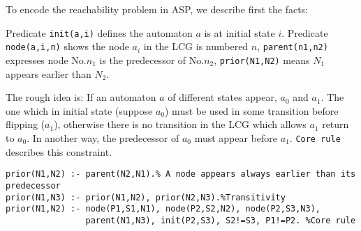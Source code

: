 \documentclass[en]{jdoc}
\begin{document}
To encode the reachability problem in ASP, we describe first the facts:

Predicate \texttt{init(a,i)} defines the automaton $a$ is at initial state $i$. %
Predicate \texttt{node(a,i,n)} shows the node $a_i$ in the LCG is numbered $n$, \texttt{parent(n1,n2)} expresses node No.$n_1$ is the predecessor of No.$n_2$, \texttt{prior(N1,N2)} means $N_1$ appears earlier than $N_2$.

The rough idea is: If an automaton $a$ of different states appear, $a_0$ and $a_1$. 
The one which in initial state (suppose $a_0$) must be used in some transition before flipping ($a_1$), otherwise there is no transition in the LCG which allows $a_1$ return to $a_0$. 
In another way, the predecessor of $a_0$ must appear before $a_1$. \texttt{Core rule} describes this constraint.

\begin{verbatim}
prior(N1,N2) :- parent(N2,N1).% A node appears always earlier than its predecessor
prior(N1,N3) :- prior(N1,N2), prior(N2,N3).%Transitivity
prior(N1,N2) :- node(P1,S1,N1), node(P2,S2,N2), node(P2,S3,N3), 
                parent(N1,N3), init(P2,S3), S2!=S3, P1!=P2. %Core rule
\end{verbatim}
\end{document}
